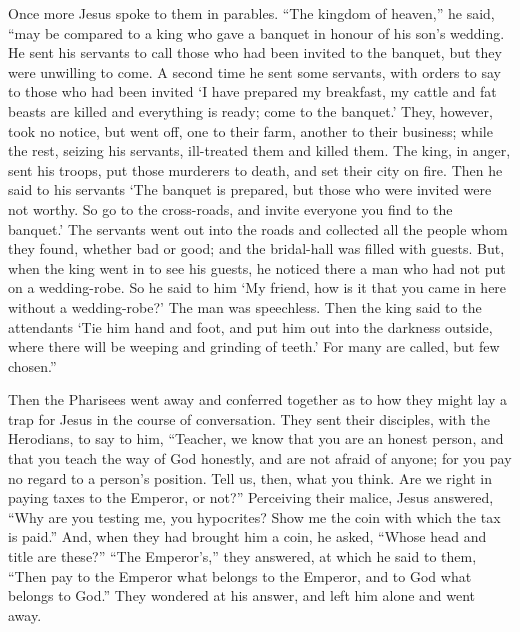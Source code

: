  Once more Jesus spoke to them in parables. 
``The kingdom of heaven,'' he said, ``may be compared to a king who gave
a banquet in honour of his son's wedding.  He sent his
servants to call those who had been invited to the banquet, but they
were unwilling to come.  A second time he sent some
servants, with orders to say to those who had been invited `I have
prepared my breakfast, my cattle and fat beasts are killed and
everything is ready; come to the banquet.'  They, however,
took no notice, but went off, one to their farm, another to their
business;  while the rest, seizing his servants, ill-treated
them and killed them.  The king, in anger, sent his troops,
put those murderers to death, and set their city on fire. 
Then he said to his servants `The banquet is prepared, but those who
were invited were not worthy.  So go to the cross-roads, and
invite everyone you find to the banquet.'  The servants
went out into the roads and collected all the people whom they found,
whether bad or good; and the bridal-hall was filled with guests.
 But, when the king went in to see his guests, he noticed
there a man who had not put on a wedding-robe.  So he said
to him `My friend, how is it that you came in here without a
wedding-robe?' The man was speechless.  Then the king said
to the attendants `Tie him hand and foot, and put him out into the
darkness outside, where there will be weeping and grinding of teeth.'
 For many are called, but few chosen.''

 Then the Pharisees went away and conferred together as to
how they might lay a trap for Jesus in the course of conversation.
 They sent their disciples, with the Herodians, to say to
him, ``Teacher, we know that you are an honest person, and that you
teach the way of God honestly, and are not afraid of anyone; for you pay
no regard to a person's position.  Tell us, then, what you
think. Are we right in paying taxes to the Emperor, or not?''
 Perceiving their malice, Jesus answered, ``Why are you
testing me, you hypocrites?  Show me the coin with which
the tax is paid.'' And, when they had brought him a coin, 
he asked, ``Whose head and title are these?''  ``The
Emperor's,'' they answered, at which he said to them, ``Then pay to the
Emperor what belongs to the Emperor, and to God what belongs to God.''
 They wondered at his answer, and left him alone and went
away.

